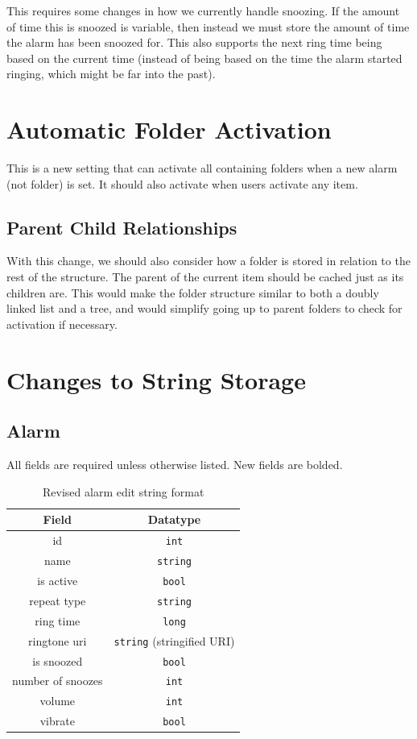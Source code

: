 \documentclass[11pt]{article} %
\begin{document}
This requires some changes in how we currently handle snoozing. If the amount of time this is snoozed is variable, then instead we must store the amount of time the alarm has been snoozed for. This also supports the next ring time being based on the current time (instead of being based on the time the alarm started ringing, which might be far into the past). 

\section{Automatic Folder Activation}
\label{sec:autoFolderActivation}
This is a new setting that can activate all containing folders when a new alarm (not folder) is set. It should also activate when users activate any item. 

\subsection{Parent Child Relationships}
\label{sec:folderRelations}
With this change, we should also consider how a folder is stored in relation to the rest of the structure. The parent of the current item should be cached just as its children are. This would make the folder structure similar to both a doubly linked list and a tree, and would simplify going up to parent folders to check for activation if necessary.

\section{Changes to String Storage}
\label{sec:stringChanges}
\subsection{Alarm}
\label{sec:alarmChanges}
All fields are required unless otherwise listed. New fields are bolded. 
\begin{table}[H]
	\centering
	\begin{tabular}{c|c}
		Field & Datatype \\ \hline
		id & \verb|int| \\
		name & \verb|string| \\
		is active & \verb|bool| \\
		repeat type & \verb|string| \\
		ring time & \verb|long| \\
		ringtone uri & \verb|string| (stringified URI) \\
		is snoozed & \verb|bool| \\
		number of snoozes & \verb|int| \\
		volume & \verb|int| \\
		vibrate & \verb|bool| \\
	\end{tabular}
	\caption{Revised alarm edit string format}
\end{table}
\end{document}
